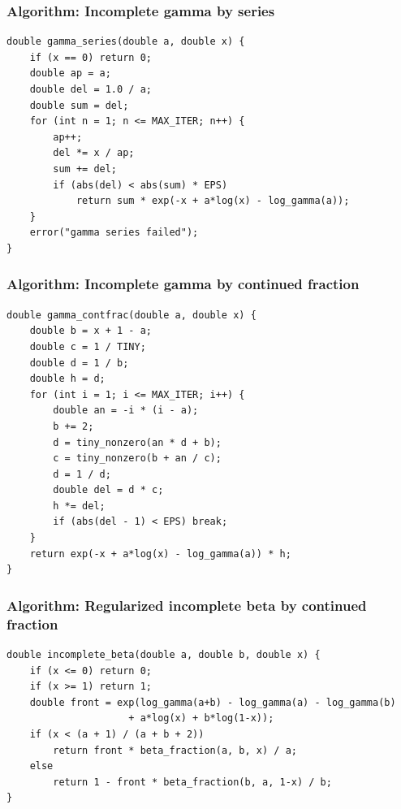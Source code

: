 \documentclass[11pt]{article}
\begin{document}
\subsubsection{Algorithm: Incomplete gamma by series}\label{algorithm-incomplete-gamma-by-series}

\begin{verbatim}
double gamma_series(double a, double x) {
    if (x == 0) return 0;
    double ap = a;
    double del = 1.0 / a;
    double sum = del;
    for (int n = 1; n <= MAX_ITER; n++) {
        ap++;
        del *= x / ap;
        sum += del;
        if (abs(del) < abs(sum) * EPS)
            return sum * exp(-x + a*log(x) - log_gamma(a));
    }
    error("gamma series failed");
}
\end{verbatim}

\subsubsection{Algorithm: Incomplete gamma by continued fraction}\label{algorithm-incomplete-gamma-by-continued-fraction}

\begin{verbatim}
double gamma_contfrac(double a, double x) {
    double b = x + 1 - a;
    double c = 1 / TINY;
    double d = 1 / b;
    double h = d;
    for (int i = 1; i <= MAX_ITER; i++) {
        double an = -i * (i - a);
        b += 2;
        d = tiny_nonzero(an * d + b);
        c = tiny_nonzero(b + an / c);
        d = 1 / d;
        double del = d * c;
        h *= del;
        if (abs(del - 1) < EPS) break;
    }
    return exp(-x + a*log(x) - log_gamma(a)) * h;
}
\end{verbatim}

\subsubsection{Algorithm: Regularized incomplete beta by continued fraction}\label{algorithm-regularized-incomplete-beta-by-continued-fraction}

\begin{verbatim}
double incomplete_beta(double a, double b, double x) {
    if (x <= 0) return 0;
    if (x >= 1) return 1;
    double front = exp(log_gamma(a+b) - log_gamma(a) - log_gamma(b)
                     + a*log(x) + b*log(1-x));
    if (x < (a + 1) / (a + b + 2))
        return front * beta_fraction(a, b, x) / a;
    else
        return 1 - front * beta_fraction(b, a, 1-x) / b;
}
\end{verbatim}
\end{document}
